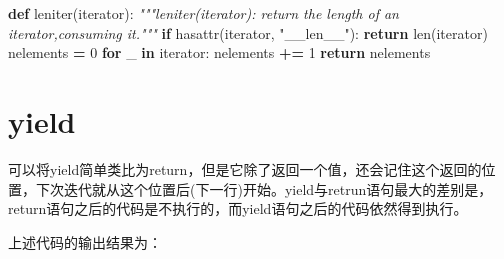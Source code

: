 \documentclass[]{ctexbook}
\newenvironment{Shaded}{\begin{snugshade}}{\end{snugshade}}
\newcommand{\BuiltInTok}[1]{#1}
\newcommand{\CommentTok}[1]{\textcolor[rgb]{0.56,0.35,0.01}{\textit{#1}}}
\newcommand{\ControlFlowTok}[1]{\textcolor[rgb]{0.13,0.29,0.53}{\textbf{#1}}}
\newcommand{\DecValTok}[1]{\textcolor[rgb]{0.00,0.00,0.81}{#1}}
\newcommand{\KeywordTok}[1]{\textcolor[rgb]{0.13,0.29,0.53}{\textbf{#1}}}
\newcommand{\NormalTok}[1]{#1}
\newcommand{\OperatorTok}[1]{\textcolor[rgb]{0.81,0.36,0.00}{\textbf{#1}}}
\newcommand{\SpecialCharTok}[1]{\textcolor[rgb]{0.00,0.00,0.00}{#1}}
\newcommand{\StringTok}[1]{\textcolor[rgb]{0.31,0.60,0.02}{#1}}
\begin{document}
\begin{Shaded}
\begin{Highlighting}[]
\KeywordTok{def}\NormalTok{ leniter(iterator):}
    \CommentTok{"""leniter(iterator): return the length of an iterator,consuming it."""}
    \ControlFlowTok{if} \BuiltInTok{hasattr}\NormalTok{(iterator, }\StringTok{"__len__"}\NormalTok{):}
        \ControlFlowTok{return} \BuiltInTok{len}\NormalTok{(iterator)}
\NormalTok{    nelements }\OperatorTok{=} \DecValTok{0}
    \ControlFlowTok{for}\NormalTok{ _ }\KeywordTok{in}\NormalTok{ iterator:}
\NormalTok{        nelements }\OperatorTok{+=} \DecValTok{1}
    \ControlFlowTok{return}\NormalTok{ nelements}
\end{Highlighting}
\end{Shaded}

\hypertarget{yield}{%
\section{yield}\label{yield}}

可以将yield简单类比为return，但是它除了返回一个值，还会记住这个返回的位置，下次迭代就从这个位置后(下一行)开始。yield与retrun语句最大的差别是，return语句之后的代码是不执行的，而yield语句之后的代码依然得到执行。

\begin{Shaded}
\end{Shaded}

上述代码的输出结果为：
\end{document}
